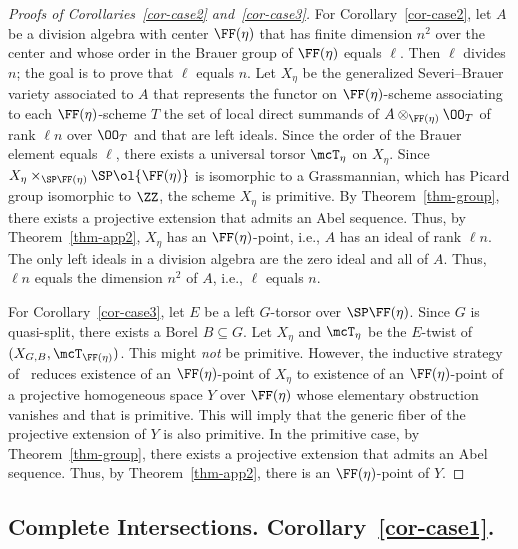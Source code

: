 \begin{proof}[Proofs of Corollaries~\ref{cor-case2} and~\ref{cor-case3}]
For Corollary~\ref{cor-case2}, let $A$ be a division algebra with center $\FF(\eta)$ that has finite dimension $n^2$ over the center and whose order in the Brauer group of $\FF(\eta)$ equals $\ell$. Then $\ell$ divides $n$; the goal is to prove that $\ell$ equals $n$. Let $X_\eta$ be the generalized Severi--Brauer variety associated to $A$ that represents the functor on $\FF(\eta)$-scheme associating to each $\FF(\eta)$-scheme $T$ the set of local direct summands of $A\otimes_{\FF(\eta)}\OO_T$ of rank $\ell n$ over $\OO_T$ and that are left ideals. Since the order of the Brauer element equals $\ell$, there exists a universal torsor $\mcT_\eta$ on $X_\eta$. Since $X_\eta \times_{\SP \FF(\eta)} \SP
\ol{\FF(\eta)}$ is isomorphic to a Grassmannian, which has Picard group isomorphic to $\ZZ$, the scheme $X_\eta$ is primitive. By Theorem~\ref{thm-group}, there exists a projective extension that admits an Abel sequence. Thus, by Theorem~\ref{thm-app2}, $X_\eta$ has an $\FF(\eta)$-point, i.e., $A$ has an ideal of rank $\ell n$. The only left ideals in a division algebra are the zero ideal and all of $A$. Thus, $\ell n$ equals the dimension $n^2$ of $A$, i.e., $\ell$ equals $n$.

For Corollary~\ref{cor-case3}, let $E$ be a left $G$-torsor over $\SP \FF(\eta)$. Since $G$ is quasi-split, there exists a Borel $B\subseteq G$. Let $X_\eta$ and $\mcT_\eta$ be the $E$-twist of $(X_{G,B},\mcT_{\FF(\eta)})$. This might
\emph{not} be primitive. However, the inductive strategy of~\cite[Lemma~12.1]{Zhu} reduces existence of an $\FF(\eta)$-point of $X_\eta$ to existence of an $\FF(\eta)$-point of a projective homogeneous space $Y$ over $\FF(\eta)$ whose elementary obstruction vanishes and that is primitive. This will imply that the generic fiber of the projective extension of $Y$ is also primitive. In the primitive case, by Theorem~\ref{thm-group}, there exists a projective extension that admits an Abel sequence. Thus, by Theorem~\ref{thm-app2}, there is an $\FF(\eta)$-point of $Y$.
\end{proof}



\subsection{Complete Intersections. Corollary~\ref{cor-case1}.} \label{subsec-CI}

